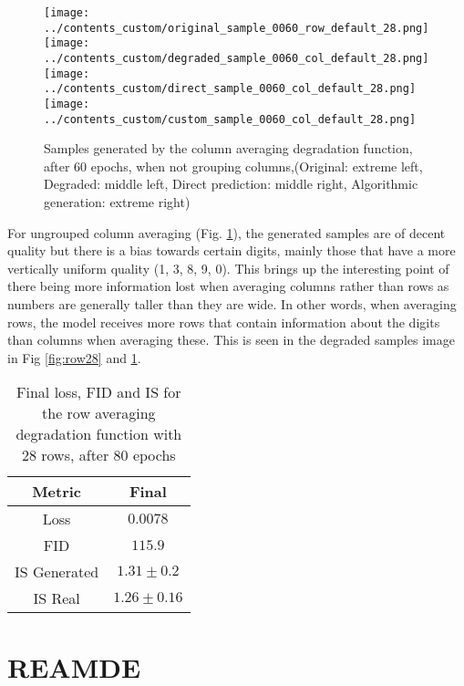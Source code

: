 \documentclass[12pt]{report} %
\begin{document}
\newpage

\begin{figure}[h]
  \centering
  \texttt{[image: ../contents\_custom/original\_sample\_0060\_row\_default\_28.png]}
  \texttt{[image: ../contents\_custom/degraded\_sample\_0060\_col\_default\_28.png]}
  \texttt{[image: ../contents\_custom/direct\_sample\_0060\_col\_default\_28.png]}
  \texttt{[image: ../contents\_custom/custom\_sample\_0060\_col\_default\_28.png]}
  \captionsetup{font=footnotesize}
  \caption{Samples generated by the column averaging degradation function, after 60 epochs, when not grouping columns,(Original: extreme left, Degraded: middle left, Direct prediction: middle right, Algorithmic generation: extreme right)}
  \label{fig:col28}
\end{figure}

For ungrouped column averaging (Fig. \ref{fig:col28}), the generated samples are of decent quality but there is a bias towards certain digits, mainly those that have a more vertically uniform quality (1, 3, 8, 9, 0). This brings up the interesting point of there being more information lost when averaging columns rather than rows as numbers are generally taller than they are wide. In other words, when averaging rows, the model receives more rows that contain information about the digits than columns when averaging these. This is seen in the degraded samples image in Fig \ref{fig:row28} and \ref{fig:col28}.

\begin{table}
  \centering
  \begin{tabular}{c c}
    \hline
    Metric & Final \\
    \hline
    Loss & $0.0078$ \\
    FID & $115.9$ \\
    IS Generated & $1.31 \pm 0.2$ \\
    IS Real & $1.26 \pm 0.16$ \\
    \hline
  \end{tabular}
  \captionsetup{font=footnotesize}
  \caption{Final loss, FID and IS for the row averaging degradation function with 28 rows, after 80 epochs}
  \label{tab:row28}
\end{table}

\newpage

\section{REAMDE}
\end{document}
